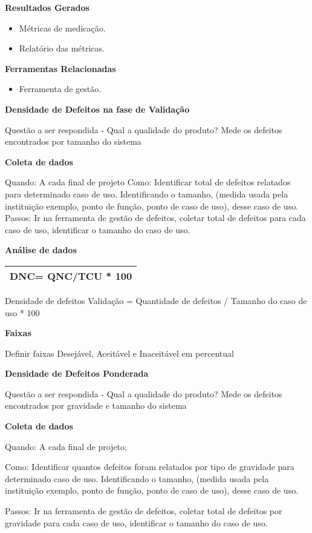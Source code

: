 \textbf{Resultados Gerados}
\begin{itemize}
    \item Métricas de medicação.
    \item Relatório das métricas.
\end{itemize}

\textbf{Ferramentas Relacionadas}
\begin{itemize}
    \item Ferramenta de gestão.
\end{itemize}

\textbf{Densidade de Defeitos na fase de Validação}

Questão a ser respondida - Qual a qualidade do produto? Mede os defeitos encontrados por tamanho do sistema

\textbf{Coleta de dados}

Quando: A cada final de projeto Como: Identificar total de defeitos relatados para determinado caso de uso. Identificando o tamanho, (medida usada pela instituição exemplo, ponto de função, ponto de caso de uso), desse caso de uso. Passos: Ir na ferramenta de gestão de defeitos, coletar total de defeitos para cada caso de uso, identificar o tamanho do caso de uso.

\textbf{Análise de dados}

\begin{tabular}{|l|}
\hline
DNC= QNC/TCU * 100 \\ 
\hline
\end{tabular}

Densidade de defeitos Validação = Quantidade de defeitos / Tamanho do caso de uso * 100

\textbf{Faixas}

Definir faixas Desejável, Aceitável e Inaceitável em percentual

\textbf{Densidade de Defeitos Ponderada}

Questão a ser respondida - Qual a qualidade do produto? Mede os defeitos encontrados por gravidade e tamanho do sistema

\textbf{Coleta de dados}

Quando: A cada final de projeto;

Como: Identificar quantos defeitos foram relatados por tipo de gravidade para determinado caso de uso. Identificando o tamanho, (medida usada pela instituição exemplo, ponto de função, ponto de caso de uso), desse caso de uso. 

Passos: Ir na ferramenta de gestão de defeitos, coletar total de defeitos por gravidade para cada caso de uso, identificar o tamanho do caso de uso.

